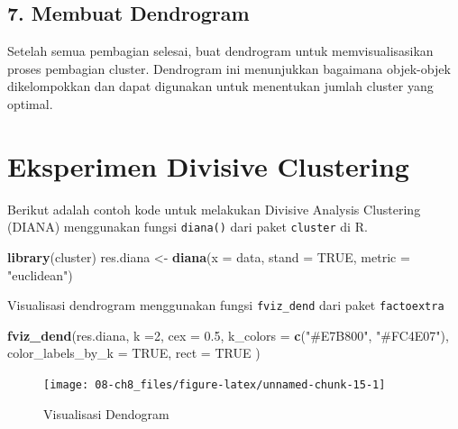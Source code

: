 \documentclass[
  oneside]{book}
\newenvironment{Shaded}{\begin{snugshade}}{\end{snugshade}}
\newcommand{\AttributeTok}[1]{\textcolor[rgb]{0.13,0.29,0.53}{#1}}
\newcommand{\ConstantTok}[1]{\textcolor[rgb]{0.56,0.35,0.01}{#1}}
\newcommand{\DecValTok}[1]{\textcolor[rgb]{0.00,0.00,0.81}{#1}}
\newcommand{\FloatTok}[1]{\textcolor[rgb]{0.00,0.00,0.81}{#1}}
\newcommand{\FunctionTok}[1]{\textcolor[rgb]{0.13,0.29,0.53}{\textbf{#1}}}
\newcommand{\NormalTok}[1]{#1}
\newcommand{\OtherTok}[1]{\textcolor[rgb]{0.56,0.35,0.01}{#1}}
\newcommand{\StringTok}[1]{\textcolor[rgb]{0.31,0.60,0.02}{#1}}
\begin{document}
\subsection*{7. Membuat Dendrogram}\label{membuat-dendrogram-1}

Setelah semua pembagian selesai, buat dendrogram untuk memvisualisasikan proses pembagian cluster. Dendrogram ini menunjukkan bagaimana objek-objek dikelompokkan dan dapat digunakan untuk menentukan jumlah cluster yang optimal.

\section{Eksperimen Divisive Clustering}\label{eksperimen-divisive-clustering}

Berikut adalah contoh kode untuk melakukan Divisive Analysis Clustering (DIANA) menggunakan fungsi \texttt{diana()} dari paket \texttt{cluster} di R.

\begin{Shaded}
\begin{Highlighting}[]
\FunctionTok{library}\NormalTok{(cluster)}
\NormalTok{res.diana }\OtherTok{\textless{}{-}} \FunctionTok{diana}\NormalTok{(}\AttributeTok{x =}\NormalTok{ data, }
                   \AttributeTok{stand =} \ConstantTok{TRUE}\NormalTok{, }
                   \AttributeTok{metric =} \StringTok{"euclidean"}\NormalTok{)}
\end{Highlighting}
\end{Shaded}

Visualisasi dendrogram menggunakan fungsi \texttt{fviz\_dend} dari paket \texttt{factoextra}

\begin{Shaded}
\begin{Highlighting}[]
\FunctionTok{fviz\_dend}\NormalTok{(res.diana, }\AttributeTok{k =}\DecValTok{2}\NormalTok{, }
          \AttributeTok{cex =} \FloatTok{0.5}\NormalTok{, }
          \AttributeTok{k\_colors =} \FunctionTok{c}\NormalTok{(}\StringTok{"\#E7B800"}\NormalTok{, }\StringTok{"\#FC4E07"}\NormalTok{),}
          \AttributeTok{color\_labels\_by\_k =} \ConstantTok{TRUE}\NormalTok{, }
          \AttributeTok{rect =} \ConstantTok{TRUE} 
\NormalTok{          )}
\end{Highlighting}
\end{Shaded}

\begin{figure}[h]

{\centering \texttt{[image: 08-ch8\_files/figure-latex/unnamed-chunk-15-1]} 

}

\caption{Visualisasi Dendogram}\label{fig:unnamed-chunk-15}
\end{figure}
\end{document}
